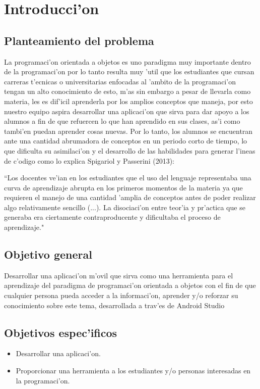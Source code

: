 \chapter{Introducci'on}

\section{Planteamiento del problema}
La programaci'on orientada a objetos es uno paradigma muy importante dentro de la programaci'on por lo tanto resulta muy 'util que los estudiantes que cursan carreras t'ecnicas o universitarias enfocadas al 'ambito de la programaci'on tengan un alto conocimiento de esto, m'as sin embargo a pesar de llevarla como materia, les es dif'icil aprenderla por los amplios conceptos que maneja, por esto nuestro equipo aspira desarrollar una aplicaci'on que sirva para dar apoyo a los alumnos a fin de que refuercen lo que han aprendido en sus clases, as'i como tambi'en puedan aprender cosas nuevas.
Por lo tanto, los alumnos se encuentran ante una cantidad abrumadora de conceptos en un periodo corto de tiempo, lo que dificulta su asimilaci'on y el desarrollo de las habilidades para generar l'ineas de c'odigo como lo explica Spigariol y Passerini (2013):

``Los docentes ve'ian en los estudiantes que el uso del lenguaje representaba una curva de aprendizaje abrupta en los primeros momentos de la materia ya que requieren el manejo de una cantidad 'amplia de conceptos antes de poder realizar algo relativamente sencillo (...). La disociaci'on entre teor'ia y pr'actica que se generaba era ciertamente contraproducente y dificultaba el proceso de aprendizaje."

\section{Objetivo general}
Desarrollar una aplicaci'on m'ovil que sirva como una herramienta para el aprendizaje del paradigma de programaci'on orientada a objetos con el fin de que cualquier persona pueda acceder a la informaci'on, aprender y/o reforzar su conocimiento sobre este tema, desarrollada a trav'es de Android Studio 

\section{Objetivos espec'ificos} 
\begin{itemize}
\item Desarrollar una aplicaci'on.
\item Proporcionar una herramienta a los estudiantes y/o personas interesadas en la programaci'on.
\end{itemize}
